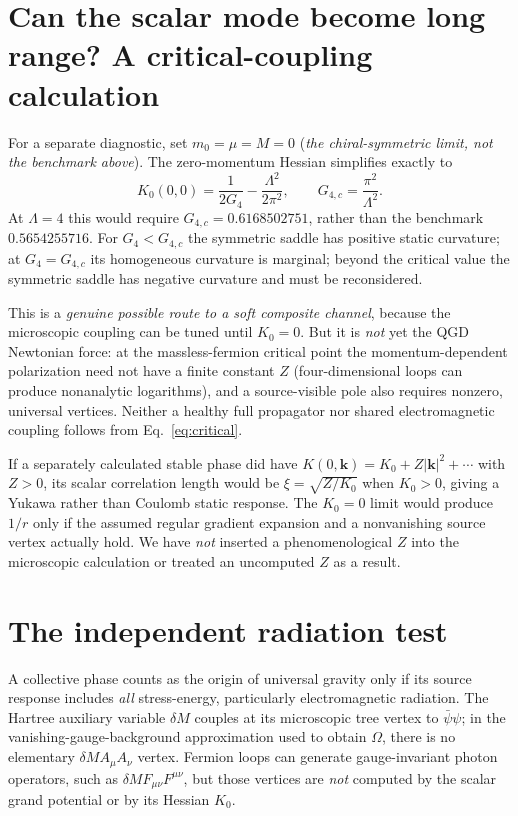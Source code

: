 \documentclass[11pt,a4paper]{article}
\theoremstyle{definition}\newtheorem{definition}[theorem]{Definition}
\theoremstyle{remark}\newtheorem{remark}[theorem]{Remark}
\begin{document}
\section{Can the scalar mode become long range? A critical-coupling calculation}
\label{sec:critical}
For a separate diagnostic, set $m_0=\mu=M=0$ (\emph{the chiral-symmetric limit, not the benchmark above}). The zero-momentum Hessian simplifies exactly to
\begin{equation}\label{eq:critical}
\boxed{K_0(0,0)=\frac1{2G_4}-\frac{\Lambda^2}{2\pi^2},\qquad
G_{4,c}=\frac{\pi^2}{\Lambda^2}.}
\end{equation}
At $\Lambda=4$ this would require $G_{4,c}=0.6168502751$, rather than the benchmark $0.5654255716$. For $G_4<G_{4,c}$ the symmetric saddle has positive static curvature; at $G_4=G_{4,c}$ its homogeneous curvature is marginal; beyond the critical value the symmetric saddle has negative curvature and must be reconsidered.

This is a \emph{genuine possible route to a soft composite channel}, because the microscopic coupling can be tuned until $K_0=0$. But it is \emph{not} yet the QGD Newtonian force: at the massless-fermion critical point the momentum-dependent polarization need not have a finite constant $Z$ (four-dimensional loops can produce nonanalytic logarithms), and a source-visible pole also requires nonzero, universal vertices. Neither a healthy full propagator nor shared electromagnetic coupling follows from Eq.~\eqref{eq:critical}.

If a separately calculated stable phase did have $K(0,\bm k)=K_0+Z|\bm k|^2+\cdots$ with $Z>0$, its scalar correlation length would be $\xi=\sqrt{Z/K_0}$ when $K_0>0$, giving a Yukawa rather than Coulomb static response. The $K_0=0$ limit would produce $1/r$ only if the assumed regular gradient expansion and a nonvanishing source vertex actually hold. We have \emph{not} inserted a phenomenological $Z$ into the microscopic calculation or treated an uncomputed $Z$ as a result.

\section{The independent radiation test}
\label{sec:radiation}
A collective phase counts as the origin of universal gravity only if its source response includes \emph{all} stress-energy, particularly electromagnetic radiation. The Hartree auxiliary variable $\delta M$ couples at its microscopic tree vertex to $\bar\psi\psi$; in the vanishing-gauge-background approximation used to obtain $\Omega$, there is no elementary $\delta M A_\mu A_\nu$ vertex. Fermion loops can generate gauge-invariant photon operators, such as $\delta M F_{\mu\nu}F^{\mu\nu}$, but those vertices are \emph{not} computed by the scalar grand potential or by its Hessian $K_0$.
\end{document}
